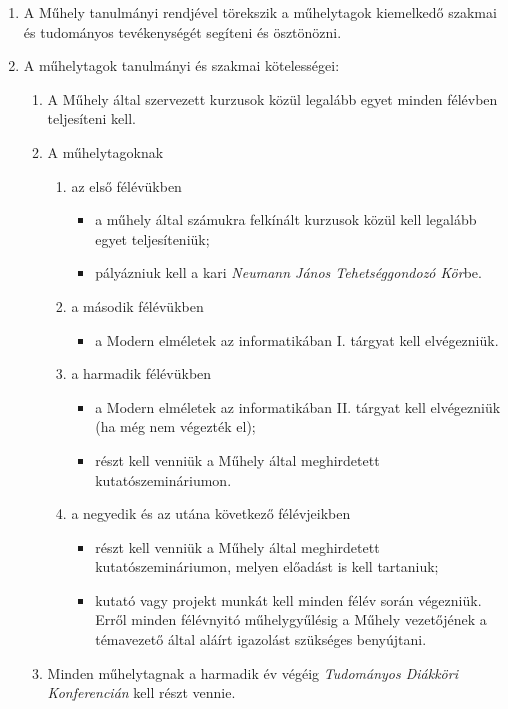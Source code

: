 \documentclass{../styles/rulebook}
\begin{document}
\begin{enumerate}
\item A Műhely tanulmányi rendjével törekszik a műhelytagok kiemelkedő szakmai és tudományos tevékenységét segíteni és ösztönözni.
\item A műhelytagok tanulmányi és szakmai kötelességei:
	\begin{enumerate}
		\item A Műhely által szervezett kurzusok közül legalább egyet minden félévben teljesíteni kell.
		\item A műhelytagoknak
			\begin{enumerate}
				\item az első félévükben 
					\begin{itemize}
						\item a műhely által számukra felkínált kurzusok közül kell legalább egyet teljesíteniük;
						\item pályázniuk kell a kari \emph{Neumann János Tehetséggondozó Kör}be.
					\end{itemize}
				\item a második félévükben
					\begin{itemize}
						\item a Modern elméletek az informatikában I. tárgyat kell elvégezniük.
					\end{itemize}
				\item a harmadik félévükben 
					\begin{itemize}
						\item a Modern elméletek az informatikában II. tárgyat kell elvégezniük (ha még nem végezték el);
						\item részt kell venniük a Műhely által meghirdetett kutatószemináriumon.
					\end{itemize}
				\item a negyedik és az utána következő félévjeikben 
					\begin{itemize}
						\item részt kell venniük a Műhely által meghirdetett kutatószemináriumon, melyen előadást is kell tartaniuk;
						\item kutató vagy projekt munkát kell minden félév során végezniük. Erről minden félévnyitó műhelygyűlésig a Műhely vezetőjének a témavezető által aláírt igazolást szükséges benyújtani.
					\end{itemize}
			\end{enumerate}
		\item Minden műhelytagnak a harmadik év végéig \emph{Tudományos Diákköri Konferencián} kell részt vennie.

\end{enumerate}
\end{enumerate}
\end{document}

